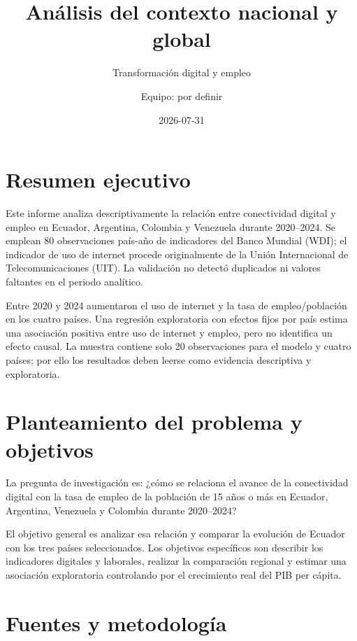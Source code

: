 \documentclass[
  spanish,
  letterpaper,
  DIV=11,
  numbers=noendperiod]{scrartcl}
\title{Análisis del contexto nacional y global}
\subtitle{Transformación digital y empleo}
\author{Equipo: por definir}
\date{2026-07-31}
\renewcommand*\contentsname{Tabla de contenidos}
\newcommand\contentsname{Tabla de contenidos}
\begin{document}
\maketitle

\renewcommand*\contentsname{Tabla de contenidos}
{
\setcounter{tocdepth}{3}
\tableofcontents
}

\section{Resumen ejecutivo}\label{resumen-ejecutivo}

Este informe analiza descriptivamente la relación entre conectividad
digital y empleo en Ecuador, Argentina, Colombia y Venezuela durante
2020--2024. Se emplean 80 observaciones país-año de indicadores del
Banco Mundial (WDI); el indicador de uso de internet procede
originalmente de la Unión Internacional de Telecomunicaciones (UIT). La
validación no detectó duplicados ni valores faltantes en el periodo
analítico.

Entre 2020 y 2024 aumentaron el uso de internet y la tasa de
empleo/población en los cuatro países. Una regresión exploratoria con
efectos fijos por país estima una asociación positiva entre uso de
internet y empleo, pero no identifica un efecto causal. La muestra
contiene solo 20 observaciones para el modelo y cuatro países; por ello
los resultados deben leerse como evidencia descriptiva y exploratoria.

\section{Planteamiento del problema y
objetivos}\label{planteamiento-del-problema-y-objetivos}

La pregunta de investigación es: ¿cómo se relaciona el avance de la
conectividad digital con la tasa de empleo de la población de 15 años o
más en Ecuador, Argentina, Venezuela y Colombia durante 2020--2024?

El objetivo general es analizar esa relación y comparar la evolución de
Ecuador con los tres países seleccionados. Los objetivos específicos son
describir los indicadores digitales y laborales, realizar la comparación
regional y estimar una asociación exploratoria controlando por el
crecimiento real del PIB per cápita.

\section{Fuentes y metodología}\label{fuentes-y-metodologuxeda}
\end{document}
